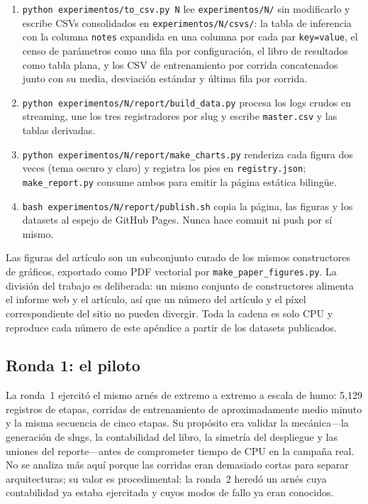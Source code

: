 \begin{enumerate}[leftmargin=*]
    \item \texttt{python experimentos/to\_csv.py N} lee \texttt{experimentos/N/} sin modificarlo y escribe CSVs consolidados en \texttt{experimentos/N/csvs/}: la tabla de inferencia con la columna \texttt{notes} expandida en una columna por cada par \texttt{key=value}, el censo de parámetros como una fila por configuración, el libro de resultados como tabla plana, y los CSV de entrenamiento por corrida concatenados junto con su media, desviación estándar y última fila por corrida.
    \item \texttt{python experimentos/N/report/build\_data.py} procesa los logs crudos en streaming, une los tres registradores por slug y escribe \texttt{master.csv} y las tablas derivadas.
    \item \texttt{python experimentos/N/report/make\_charts.py} renderiza cada figura dos veces (tema oscuro y claro) y registra los pies en \texttt{registry.json}; \texttt{make\_report.py} consume ambos para emitir la página estática bilingüe.
    \item \texttt{bash experimentos/N/report/publish.sh} copia la página, las figuras y los datasets al espejo de GitHub Pages. Nunca hace commit ni push por sí mismo.
\end{enumerate}

Las figuras del artículo son un subconjunto curado de los mismos constructores de gráficos, exportado como PDF vectorial por \texttt{make\_paper\_figures.py}. La división del trabajo es deliberada: un mismo conjunto de constructores alimenta el informe web y el artículo, así que un número del artículo y el píxel correspondiente del sitio no pueden divergir. Toda la cadena es solo CPU y reproduce cada número de este apéndice a partir de los datasets publicados.

\subsection{Ronda 1: el piloto}

La ronda~1 ejercitó el mismo arnés de extremo a extremo a escala de humo: 5{,}129 registros de etapas, corridas de entrenamiento de aproximadamente medio minuto y la misma secuencia de cinco etapas. Su propósito era validar la mecánica---la generación de slugs, la contabilidad del libro, la simetría del despliegue y las uniones del reporte---antes de comprometer tiempo de CPU en la campaña real. No se analiza más aquí porque las corridas eran demasiado cortas para separar arquitecturas; su valor es procedimental: la ronda~2 heredó un arnés cuya contabilidad ya estaba ejercitada y cuyos modos de fallo ya eran conocidos.
